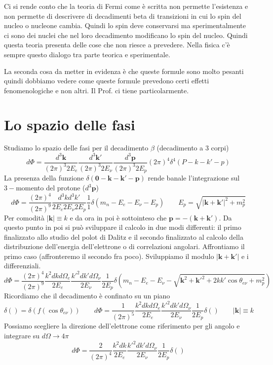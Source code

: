 Ci si rende conto che la teoria di Fermi come è scritta non permette l'esistenza e non permette di descrivere di decadimenti beta di transizioni in cui lo spin del nucleo o nucleone cambia. Quindi lo spin deve conservarsi ma sperimentalmente ci sono dei nuclei che nel loro decadimento modificano lo spin del nucleo. Quindi questa teoria presenta delle cose che non riesce a prevedere. Nella fisica c'è sempre questo dialogo tra parte teorica e sperimentale.

La seconda cosa da metter in evidenza è che queste formule sono molto pesanti quindi dobbiamo vedere come queste formule prevedono certi effetti fenomenologiche e non altri. Il Prof. ci tiene particolarmente.
\section{Lo spazio delle fasi}
Studiamo lo spazio delle fasi per il decadimento $\beta$ (decadimento a 3 corpi)
$$
d\Phi = \frac{d^3\mathbf{k}}{(2\pi)^3 2E_e} \frac{d^3\mathbf{k}'}{(2\pi)^3 2E_\nu} \frac{d^3\mathbf{p}}{(2\pi)^3 2E_p} (2\pi)^4 \delta^4(P - k - k' - p)
$$
La presenza della funzione $\delta\left( \mathbf{0}-\mathbf{k}-\mathbf{k}'-\mathbf{p}\right)$ rende banale l'integrazione sul $3-$momento del protone ($d^3\mathbf{p}$)
$$
d\Phi = \frac{(2\pi)^4}{(2\pi)^9} \frac{d^3k d^3k'}{2E_e 2E_\nu 2E_p} \frac{1}{1} \delta(m_n - E_e - E_\nu - E_p) \qquad E_p = \sqrt{|\mathbf{k} + \mathbf{k}'|^2 + m_p^2}
$$
Per comodità $|\mathbf{k}| \equiv k$ e da ora in poi è sottointeso che $\mathbf{p}=-\left(\mathbf{k}+\mathbf{k}'\right)$. Da questo punto in poi si può sviluppare il calcolo in due modi differenti: il primo finalizzato allo studio del polot di Dalitz e il secondo finalizzato al calcolo della distribuzione dell'energia dell'elettrone o di correlazioni angolari. Affrontiamo il primo caso (affronteremo il secondo fra poco). Sviluppiamo il modulo $|\mathbf{k}+\mathbf{k}'|$ e i differenziali.
$$
d\Phi = \frac{(2\pi)^4}{(2\pi)^9} \frac{k^2 dk d\Omega_e}{2E_e} \frac{k'^2 dk' d\Omega_\nu}{2E_\nu} \frac{1}{2E_p} \delta(m_n - E_e - E_\nu - \sqrt{\mathbf{k}^2 + \mathbf{k}'^2 + 2kk' \cos\theta_{e\nu} + m_p^2})
$$
Ricordiamo che il decadimento è confinato su un piano
$$
\delta( ) = \delta(f(\cos\theta_{e\nu})) \qquad d\Phi = \frac{1}{(2\pi)^5} \frac{k^2 dk d\Omega_e}{2E_e} \frac{k'^2 dk' d\Omega_\nu}{2E_\nu} \frac{1}{2E_p} \delta( ) \qquad |\mathbf{k}| \equiv k 
$$
Possiamo scegliere la direzione dell'elettrone come riferimento per gli angolo e integrare su $d\Omega\to4\pi$
$$
d\Phi = \frac{2}{(2\pi)^4} \frac{k^2 dk}{2E_e} \frac{k'^2 dk' d\Omega_\nu}{2E_\nu} \frac{1}{2E_p} \delta( )
$$
